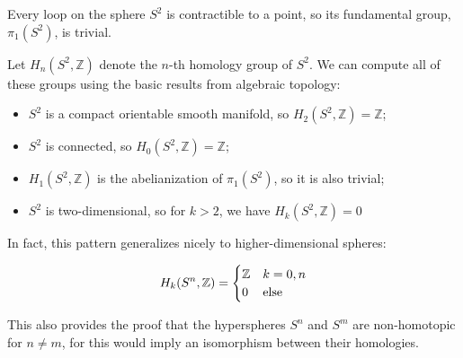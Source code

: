 \documentclass[12pt]{article}
\newcommand{\mb}{\mathbb}
\newcommand{\Z}{\mb{Z}}
\newcommand{\<}{\langle}
\renewcommand{\>}{\rangle}
\begin{document}
Every loop on the sphere $S^2$ is contractible to a point, so its fundamental group, $\pi_1(S^2)$, is trivial.

Let $H_n(S^2,\Z)$ denote the $n$-th homology group of $S^2$.  We can compute all of these groups using the basic results from algebraic topology:
\begin{itemize} 
\item $S^2$ is a compact orientable smooth manifold, so $H_2(S^2,\Z)=\Z$;
\item $S^2$ is connected, so $H_0(S^2,\Z)=\Z$;
\item $H_1(S^2,\Z)$ is the abelianization of $\pi_1(S^2)$, so it is also trivial;
\item $S^2$ is two-dimensional, so for $k>2$, we have $H_k(S^2,\Z)=0$
\end{itemize}

In fact, this pattern generalizes nicely to higher-dimensional spheres:

\begin{align*}
H_k(S^n, \Z)=
\begin{cases}
\Z&k=0,n\\
0&{\rm else}
\end{cases}
\end{align*}

This also provides the proof that the hyperspheres $S^n$ and $S^m$ are non-homotopic for $n\neq m$, for this would imply an isomorphism between their homologies.
\end{document}
